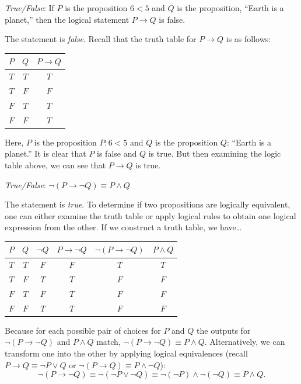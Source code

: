 \documentclass[11pt,letterpaper]{article}
\begin{document}
\thispagestyle{title}


\quizsol \textit{True/False}: If $P$ is the proposition $6 < 5$ and $Q$ is the proposition, ``Earth is a planet,'' then the logical statement $P \to Q$ is false. \pspace

\sol The statement is \textit{false}. Recall that the truth table for $P \to Q$ is as follows: \par
	\begin{table}[!ht]
	\centering
	\begin{tabular}{c|c|c}
	$P$ & $Q$ & $P \to Q$ \\ \hline
	$T$ & $T$ & $T$ \\
	$T$ & $F$ & $F$ \\
	$F$ & $T$ & $T$ \\
	$F$ & $F$ & $T$
	\end{tabular}
	\end{table} \par
Here, $P$ is the proposition $P: 6 < 5$ and $Q$ is the proposition $Q$: ``Earth is a planet.'' It is clear that $P$ is false and $Q$ is true. But then examining the logic table above, we can see that $P \to Q$ is true. \pvspace{1.5cm}



\quizsol \textit{True/False}: $\neg (P \to \neg Q) \equiv P \wedge Q$ \pspace

\sol The statement is \textit{true}. To determine if two propositions are logically equivalent, one can either examine the truth table or apply logical rules to obtain one logical expression from the other. If we construct a truth table, we have\dots \par
	\begin{table}[!ht]
	\centering
	\begin{tabular}{c|c||c|c|c||c}
	$P$ & $Q$ & $\neg Q$ & $P \to \neg Q$ & $\neg (P \to \neg Q)$ & $P \wedge Q$ \\ \hline
	$T$ & $T$ & $F$ & $F$ & $T$ & $T$ \\
	$T$ & $F$ & $T$ & $T$ & $F$ & $F$ \\
	$F$ & $T$ & $F$ & $T$ & $F$ & $F$ \\
	$F$ & $F$ & $T$ & $T$ & $F$ & $F$
	\end{tabular}
	\end{table}
Because for each possible pair of choices for $P$ and $Q$ the outputs for $\neg (P \to \neg Q)$ and $P \wedge Q$ match, $\neg (P \to \neg Q) \equiv P \wedge Q$. Alternatively, we can transform one into the other by applying logical equivalences (recall $P \to Q \equiv \neg P \vee Q$ or $\neg (P \to Q) \equiv P \wedge \neg Q$):
	\[
	\neg (P \to \neg Q) \equiv \neg (\neg P \vee \neg Q) \equiv \neg (\neg P) \wedge \neg (\neg Q) \equiv P \wedge Q.
	\]  \pvspace{0.5cm}
\end{document}
